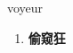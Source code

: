 
\begin{frame}
{\huge voyeur}
\begin{center}
\begin{enumerate}\Large
  \item \textbf{偷窥狂}
\end{enumerate}
\end{center}
\end{frame}
